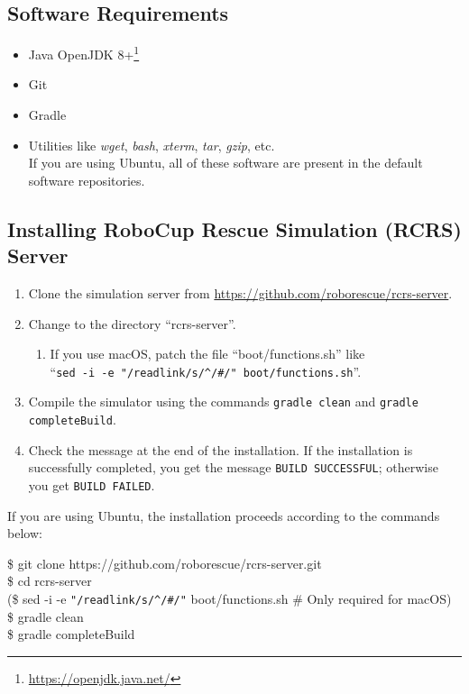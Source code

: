 \documentclass{article}
\begin{document}
\subsection{Software Requirements}
 \begin{itemize}
  \item Java OpenJDK 8+\footnote{\url{https://openjdk.java.net/}}
  \item Git
  \item Gradle
  \item Utilities like \emph{wget}, \emph{bash}, \emph{xterm}, \emph{tar}, \emph{gzip}, etc.\\
        If you are using Ubuntu, all of these software are present in the
        default software repositories.
 \end{itemize}
\subsection{Installing RoboCup Rescue Simulation (RCRS) Server}
\begin{enumerate}
 \item Clone the simulation server from
       \url{https://github.com/roborescue/rcrs-server}.
 \item Change to the directory ``rcrs-server''.
       \begin{enumerate}
	\item If you use macOS, patch the file ``boot/functions.sh''
	      like\\

	      ``\verb|sed -i -e "/readlink/s/^/#/" boot/functions.sh|''.
       \end{enumerate}
 \item Compile the simulator using the commands \texttt{gradle clean}
       and \texttt{gradle completeBuild}.
 \item Check the message at the end of the installation.
       If the installation is successfully completed, you get the message \texttt{BUILD SUCCESSFUL}; otherwise you get \texttt{BUILD FAILED}.
\end{enumerate}

If you are using Ubuntu, the installation proceeds according to the commands below:

\begin{center}
  \begin{tcolorbox}[title=Installation on Ubuntu, width=.98\linewidth]
  {\ttfamily\small
  \$ git clone https://github.com/roborescue/rcrs-server.git\\
   \$ cd rcrs-server\\
   (\$ sed -i -e \verb|"/readlink/s/^/#/"| boot/functions.sh \# Only required for macOS)\\
  \$ gradle clean\\
  \$ gradle completeBuild
  }
  \end{tcolorbox}
\end{center}
\end{document}
